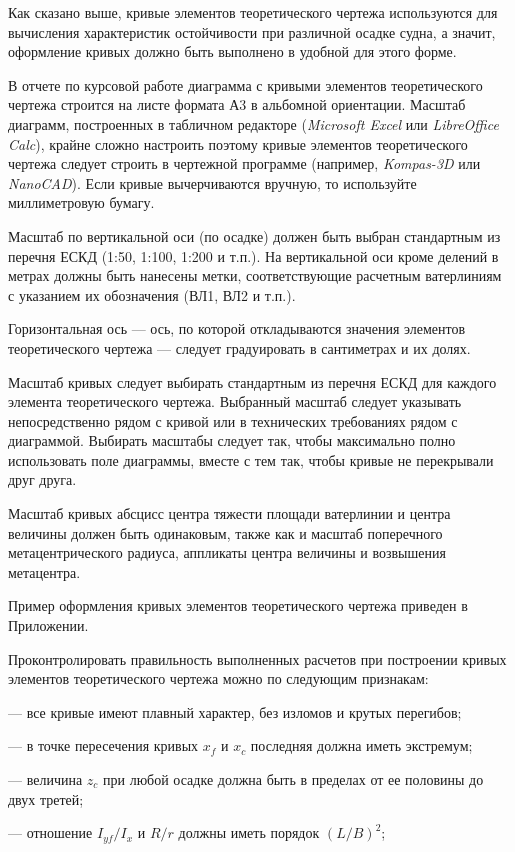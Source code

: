 Как сказано выше, кривые элементов теоретического чертежа используются для вычисления характеристик остойчивости при различной осадке судна, а значит, оформление кривых должно быть выполнено в удобной для этого форме.

В отчете по курсовой работе диаграмма с кривыми элементов теоретического чертежа строится на листе формата А3 в альбомной ориентации.
Масштаб диаграмм, построенных в табличном редакторе (\textit{Microsoft Excel} или \textit{LibreOffice Calc}), крайне сложно настроить поэтому кривые элементов теоретического чертежа следует строить в чертежной программе (например, \textit{Kompas-3D} или \textit{NanoCAD}).
Если кривые вычерчиваются вручную, то используйте миллиметровую бумагу.

Масштаб по вертикальной оси (по осадке) должен быть выбран стандартным из перечня ЕСКД (1:50, 1:100, 1:200 и т.п.).
На вертикальной оси кроме делений в метрах должны быть нанесены метки, соответствующие расчетным ватерлиниям с указанием их обозначения (ВЛ1, ВЛ2 и т.п.).

Горизонтальная ось --- ось, по которой откладываются значения элементов теоретического чертежа — следует градуировать в сантиметрах и их долях.

Масштаб кривых следует выбирать стандартным из перечня ЕСКД для каждого элемента теоретического чертежа.
Выбранный масштаб следует указывать непосредственно рядом с кривой или в технических требованиях рядом с диаграммой.
Выбирать масштабы следует так, чтобы максимально полно использовать поле диаграммы, вместе с тем так, чтобы кривые не перекрывали друг друга.

Масштаб кривых абсцисс центра тяжести площади ватерлинии и центра величины должен быть одинаковым, также как и масштаб поперечного метацентрического радиуса, аппликаты центра величины и возвышения метацентра.

Пример оформления кривых элементов теоретического чертежа приведен в Приложении.

Проконтролировать правильность выполненных расчетов при построении кривых элементов теоретического чертежа можно по следующим признакам:

--- все кривые имеют плавный характер, без изломов и крутых перегибов;

--- в точке пересечения кривых $x_f$ и $x_c$ последняя должна иметь экстремум;

--- величина $z_c$ при любой осадке должна быть в пределах от ее половины до двух третей;

--- отношение $I_{yf}/I_x$ и $R/r$ должны иметь порядок $(L/B)^2$;

